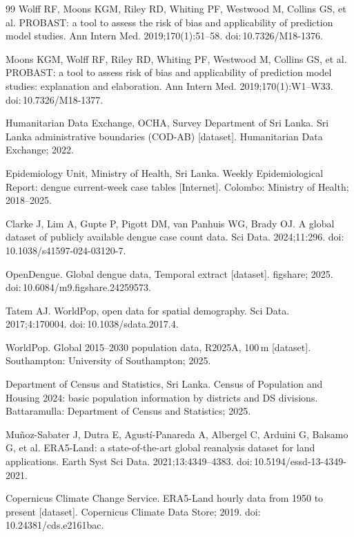 \documentclass[11pt,a4paper]{article}
\begin{document}
\begin{thebibliography}{99}
 Wolff RF, Moons KGM, Riley RD, Whiting PF, Westwood M, Collins GS, et al. PROBAST: a tool to assess the risk of bias and applicability of prediction model studies. Ann Intern Med. 2019;170(1):51--58. doi:\,10.7326/M18-1376.

 Moons KGM, Wolff RF, Riley RD, Whiting PF, Westwood M, Collins GS, et al. PROBAST: a tool to assess risk of bias and applicability of prediction model studies: explanation and elaboration. Ann Intern Med. 2019;170(1):W1--W33. doi:\,10.7326/M18-1377.

 Humanitarian Data Exchange, OCHA, Survey Department of Sri Lanka. Sri Lanka administrative boundaries (COD-AB) [dataset]. Humanitarian Data Exchange; 2022.

 Epidemiology Unit, Ministry of Health, Sri Lanka. Weekly Epidemiological Report: dengue current-week case tables [Internet]. Colombo: Ministry of Health; 2018--2025.

 Clarke J, Lim A, Gupte P, Pigott DM, van Panhuis WG, Brady OJ. A global dataset of publicly available dengue case count data. Sci Data. 2024;11:296. doi:\,10.1038/s41597-024-03120-7.

 OpenDengue. Global dengue data, Temporal extract [dataset]. figshare; 2025. doi:\,10.6084/m9.figshare.24259573.

 Tatem AJ. WorldPop, open data for spatial demography. Sci Data. 2017;4:170004. doi:\,10.1038/sdata.2017.4.

 WorldPop. Global 2015--2030 population data, R2025A, 100\,m [dataset]. Southampton: University of Southampton; 2025.

 Department of Census and Statistics, Sri Lanka. Census of Population and Housing 2024: basic population information by districts and DS divisions. Battaramulla: Department of Census and Statistics; 2025.

 Mu\~noz-Sabater J, Dutra E, Agust\'i-Panareda A, Albergel C, Arduini G, Balsamo G, et al. ERA5-Land: a state-of-the-art global reanalysis dataset for land applications. Earth Syst Sci Data. 2021;13:4349--4383. doi:\,10.5194/essd-13-4349-2021.

 Copernicus Climate Change Service. ERA5-Land hourly data from 1950 to present [dataset]. Copernicus Climate Data Store; 2019. doi:\,10.24381/cds.e2161bac.


\end{thebibliography}
\end{document}
